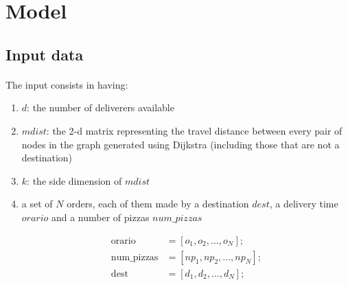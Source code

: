 \documentclass[10pt]{article}
\begin{document}
	\section{Model}
	\label{Model}

	
	\subsection{Input data}

	\paragraph*{}
	The input consists in having:
	\begin{enumerate}
		\item $d$: the number of deliverers available
		\item $mdist$: the 2-d matrix representing the travel distance between
			every pair of nodes in the graph generated using Dijkstra (including those
			that are not a destination)
		\item $k$: the side dimension of $mdist$
		\item a set of $N$ orders, each of them made by a destination $dest$, a delivery 
			time $orario$ and a number of pizzas $num\_pizzas$

			\begin{equation*}
				\begin{split}
					\text{orario} &= [o_1, o_2, \dots, o_N];\\
					\text{num\_pizzas} &= [np_1, np_2, \dots, np_N];\\
					\text{dest} &= [d_1, d_2, \dots, d_N];
				\end{split}
			\end{equation*}

	\end{enumerate}
\end{document}
